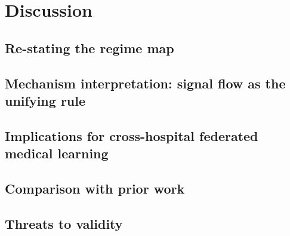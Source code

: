 \documentclass[11pt,a4paper]{report}
\begin{document}


\chapter{Discussion}
\label{ch:discussion}


\section{Re-stating the regime map}
\label{sec:disc-regime-map}

\section{Mechanism interpretation: signal flow as the unifying rule}
\label{sec:disc-signal-flow}

\section{Implications for cross-hospital federated medical learning}
\label{sec:disc-implications}

\section{Comparison with prior work}
\label{sec:disc-prior-work}

\section{Threats to validity}
\label{sec:disc-validity}
\end{document}
